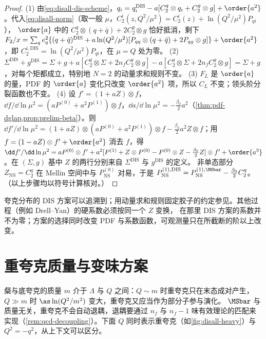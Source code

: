\begin{proof}
(1) 由\cref{eq:disall-dis-scheme}，$q_i=q_i^{\mathrm{DIS}}-a[C_2^q\otimes q_i+C_2^g\otimes g]+\order{a^2}$。代入\cref{eq:disall-norm}（取一般 $\mu$，$C_2^i(z,Q^2/\mu^2)=C_2^i(z)+\ln(Q^2/\mu^2)P_{qi}$），
$\order{a}$ 中的 $C_2^q\otimes(q+\bar q)+2C_2^g\otimes g$ 恰好抵消，剩下
$F_2/x=\sum_qe_q^2\{(q+\bar q)^{\mathrm{DIS}}+a\ln(Q^2/\mu^2)[P_{qq}\otimes(q+\bar q)+2P_{qg}\otimes g]\}+\order{a^2}$，即 $C_2^{i,\mathrm{DIS}}=\ln(Q^2/\mu^2)P_{qi}$，在 $\mu=Q$ 处为零。
(2) $\Sigma^{\mathrm{DIS}}+g^{\mathrm{DIS}}=\Sigma+g+a[C_2^q\otimes\Sigma+2n_fC_2^g\otimes g]-a[C_2^q\otimes\Sigma+2n_fC_2^g\otimes g]=\Sigma+g$，对每个矩都成立，特别地 $N=2$ 的动量求和规则不变。
(3) $F_L$ 是 $\order{a}$ 的量，PDF 的 $\order{a}$ 变化只改变 $\order{a^2}$ 项，所以 $C_L$ 不变；领头阶分裂函数也不变。
(4) 设 $f'=(1+aZ)\otimes f$，$\dd f/\dd\ln\mu^2=(aP^{(0)}+a^2P^{(1)})\otimes f$，$\dd a/\dd\ln\mu^2=-\frac{\beta_0}2a^2$（\cref{thm:pdf-dglap,prop:prelim-beta}）。则
$\dd f'/\dd\ln\mu^2=(1+aZ)\otimes(aP^{(0)}+a^2P^{(1)})\otimes f-\frac{\beta_0}2a^2Z\otimes f$；用 $f=(1-aZ)\otimes f'+\order{a^2}$ 消去 $f$，得
$\dd f'/\dd\ln\mu^2=aP^{(0)}\otimes f'+a^2[P^{(1)}+Z\otimes P^{(0)}-P^{(0)}\otimes Z-\frac{\beta_0}2Z]\otimes f'+\order{a^3}$。在 $(\Sigma,g)$ 基中 $Z$ 的两行分别来自 $\Sigma^{\mathrm{DIS}}$ 与 $g^{\mathrm{DIS}}$ 的定义。
非单态部分 $Z_{\mathrm{NS}}=C_2^q$ 在 Mellin 空间中与 $P^{(0)}_{\mathrm{NS}}$ 对易，于是 $P^{(1),\mathrm{DIS}}_{\mathrm{NS}}=P^{(1),\MSbar}_{\mathrm{NS}}-\frac{\beta_0}2C_2^q$。
（以上步骤均以符号计算核对。）
\end{proof}

\noindent
夸克分布的 DIS 方案可以追溯到\cite{AltarelliEllisMartinelli1979}；用动量求和规则固定胶子的约定参见\cite{DiemozEtAl1988}。其他过程（例如 Drell--Yan）的硬系数必须按同一个 $Z$ 变换，
在那里 DIS 方案的系数并不为零；方案的选择同时改变 PDF 与系数函数，可观测量只在所截断的阶以上改变。

\section{重夸克质量与变味方案}\label{sec:disall-heavy}

粲与底夸克的质量 $m$ 介于 $\Lambda$ 与 $Q$ 之间：$Q\sim m$ 时重夸克只在末态成对产生，$Q\gg m$ 时 $\as\ln(Q^2/m^2)$ 变大，重夸克又应当作为部分子参与演化。
$\MSbar$ 与质量无关，重夸克不会自动退耦，退耦要通过 $n_f$ 与 $n_f-1$ 味有效理论的匹配来实现（\cref{rem:qcd-decoupling}）。下面 $Q$ 同时表示重夸克（如\cref{fig:disall-heavy}）与 $Q^2=-q^2$，从上下文可以区分。

